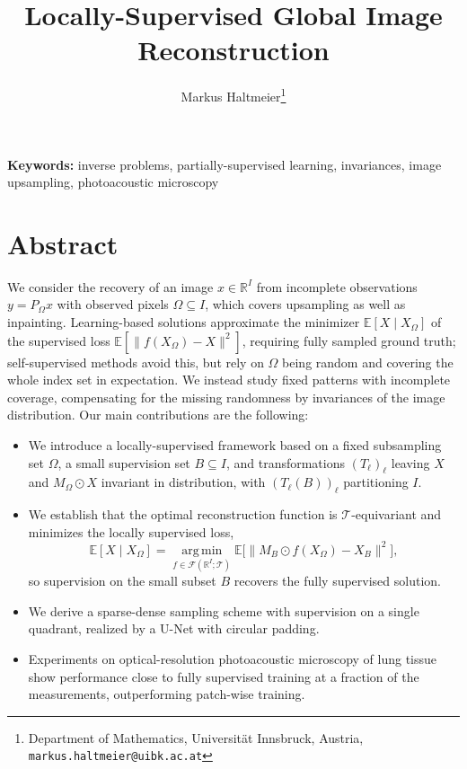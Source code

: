 \documentclass[11pt]{article}
\title{\bfseries Locally-Supervised Global Image Reconstruction}
\author{
Markus Haltmeier\thanks{Department of Mathematics, Universit\"at Innsbruck, Austria,
\texttt{markus.haltmeier@uibk.ac.at}}
}
\date{}
\begin{document}
\maketitle

\vspace{-1em}

\noindent
\textbf{Keywords:}
inverse problems, partially-supervised learning, invariances, image upsampling,
photoacoustic microscopy

\vspace{0.5em}


\vspace{1em}

\section*{Abstract}

We consider the recovery of an image $x \in \mathbb{R}^{I}$ from incomplete
observations $y = P_{\Omega} x$ with observed pixels $\Omega \subseteq I$, which
covers upsampling as well as inpainting. Learning-based solutions approximate
the minimizer $\mathbb{E}[X \mid X_{\Omega}]$ of the supervised loss
$\mathbb{E}[\lVert f(X_{\Omega}) - X\rVert^{2}]$, requiring fully sampled ground
truth; self-supervised methods avoid this, but rely on $\Omega$ being random and
covering the whole index set in expectation. We instead study fixed patterns
with incomplete coverage, compensating for the missing randomness by invariances
of the image distribution. Our main contributions are the following:

\begin{itemize}[leftmargin=1.5em]
    \item We introduce a locally-supervised framework based on a fixed
    subsampling set $\Omega$, a small supervision set $B \subseteq I$, and
    transformations $(T_{\ell})_{\ell}$ leaving $X$ and $M_{\Omega} \odot X$
    invariant in distribution, with $(T_{\ell}(B))_{\ell}$ partitioning $I$.
    \item We establish that the optimal reconstruction function is
    $\mathcal{T}$-equivariant and minimizes the locally supervised loss,
    \[
        \mathbb{E}[X \mid X_{\Omega}]
        = \operatorname*{arg\,min}_{f \in \mathcal{F}(\mathbb{R}^{I};\mathcal{T})}
          \mathbb{E}\bigl[\lVert M_{B} \odot f(X_{\Omega}) - X_{B}\rVert^{2}\bigr],
    \]
    so supervision on the small subset $B$ recovers the fully supervised solution.
    \item We derive a sparse-dense sampling scheme \cite{Walder2026} with
    supervision on a single quadrant, realized by a U-Net with circular padding.
    \item Experiments on optical-resolution photoacoustic microscopy of lung
    tissue show performance close to fully supervised training at a fraction of
    the measurements, outperforming patch-wise training.
\end{itemize}
\end{document}
